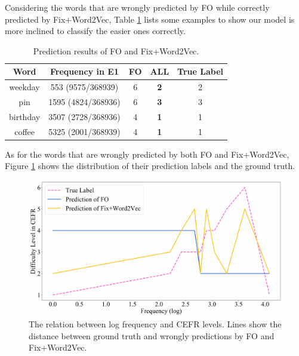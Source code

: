 Considering the words that are wrongly predicted by FO while correctly predicted by Fix+Word2Vec, Table \ref{tab:com} lists some examples to show our model is more inclined to classify the easier ones correctly.
\begin{table}[th]
	\scriptsize
	\begin{center}
		\begin{tabular}{ccccc}
			\hline
			\textbf{Word} & \textbf{Frequency in E1} & \textbf{FO} & \textbf{ALL} & \textbf{True Label} \\ \hline
			weekday & 553 (9575/368939)& 6 & \textbf{2}& 2\\ 
			pin & 1595  (4824/368936)& 6 & \textbf{3}& 3\\ 
			birthday & 3507  (2728/368936)& 4 & \textbf{1}&  1\\ 
			coffee & 5325  (2001/368939)& 4 & \textbf{1}& 1\\ 
			\hline
		\end{tabular}
	\vspace{-0.25cm}
	\end{center}
	\caption{\label{tab:com} Prediction results of FO and Fix+Word2Vec.}
\end{table}
 As for the words that are wrongly predicted by both FO and Fix+Word2Vec, Figure \ref{fig:distance} shows the distribution of their prediction labels and the ground truth.
\begin{figure}[th]
	\centering
	\includegraphics[width=1\linewidth]{pic/distance.pdf} 
	\vspace{-0.25cm}
	\caption{The relation between log frequency and CEFR levels.
					Lines show the distance between ground truth and wrongly predictions by FO and Fix+Word2Vec.}
	\label{fig:distance}
\end{figure}
